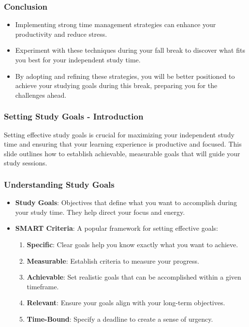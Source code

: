 \documentclass[aspectratio=169]{beamer}
\begin{document}
\begin{frame}[fragile]
    \frametitle{Conclusion}
    \begin{itemize}
        \item Implementing strong time management strategies can enhance your productivity and reduce stress. 
        \item Experiment with these techniques during your fall break to discover what fits you best for your independent study time.
        \item By adopting and refining these strategies, you will be better positioned to achieve your studying goals during this break, preparing you for the challenges ahead.
    \end{itemize}
\end{frame}

\begin{frame}[fragile]
    \frametitle{Setting Study Goals - Introduction}
    Setting effective study goals is crucial for maximizing your independent study time and ensuring that your learning experience is productive and focused. 
    This slide outlines how to establish achievable, measurable goals that will guide your study sessions.
\end{frame}

\begin{frame}[fragile]
    \frametitle{Understanding Study Goals}
    \begin{itemize}
        \item \textbf{Study Goals}: Objectives that define what you want to accomplish during your study time. They help direct your focus and energy.
        \item \textbf{SMART Criteria}: A popular framework for setting effective goals:
        \begin{enumerate}
            \item \textbf{Specific}: Clear goals help you know exactly what you want to achieve.
            \item \textbf{Measurable}: Establish criteria to measure your progress.
            \item \textbf{Achievable}: Set realistic goals that can be accomplished within a given timeframe.
            \item \textbf{Relevant}: Ensure your goals align with your long-term objectives.
            \item \textbf{Time-Bound}: Specify a deadline to create a sense of urgency.
        \end{enumerate}
    \end{itemize}
\end{frame}
\end{document}
